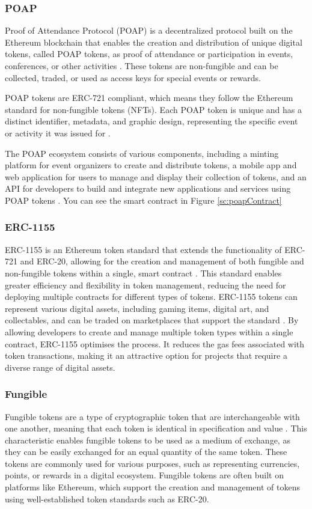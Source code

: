 \subsubsection{POAP}
Proof of Attendance Protocol (POAP) is a decentralized protocol built on the Ethereum blockchain that enables the creation and distribution of unique digital tokens, called POAP tokens, as proof of attendance or participation in events, conferences, or other activities \cite{poapWebsite}. These tokens are non-fungible and can be collected, traded, or used as access keys for special events or rewards.

POAP tokens are ERC-721 compliant, which means they follow the Ethereum standard for non-fungible tokens (\ac{NFT}s). Each POAP token is unique and has a distinct identifier, metadata, and graphic design, representing the specific event or activity it was issued for \cite{poapGithub}.

The POAP ecosystem consists of various components, including a minting platform for event organizers to create and distribute tokens, a mobile app and web application for users to manage and display their collection of tokens, and an API for developers to build and integrate new applications and services using POAP tokens \cite{poapWebsite}. You can see the smart contract in Figure \ref{sc:poapContract}


\subsubsection{ERC-1155}
ERC-1155 is an Ethereum token standard that extends the functionality of ERC-721 and ERC-20, allowing for the creation and management of both fungible and non-fungible tokens within a single, smart contract \cite{vogelsteller2015erc20}. This standard enables greater efficiency and flexibility in token management, reducing the need for deploying multiple contracts for different types of tokens. ERC-1155 tokens can represent various digital assets, including gaming items, digital art, and collectables, and can be traded on marketplaces that support the standard \cite{openzeppelinerc1155}. By allowing developers to create and manage multiple token types within a single contract, ERC-1155 optimises the process. It reduces the gas fees associated with token transactions, making it an attractive option for projects that require a diverse range of digital assets.

\subsubsection{Fungible}
Fungible tokens are a type of cryptographic token that are interchangeable with one another, meaning that each token is identical in specification and value \cite{vogelsteller2015erc20}. This characteristic enables fungible tokens to be used as a medium of exchange, as they can be easily exchanged for an equal quantity of the same token. These tokens are commonly used for various purposes, such as representing currencies, points, or rewards in a digital ecosystem. Fungible tokens are often built on platforms like Ethereum, which support the creation and management of tokens using well-established token standards such as ERC-20.

